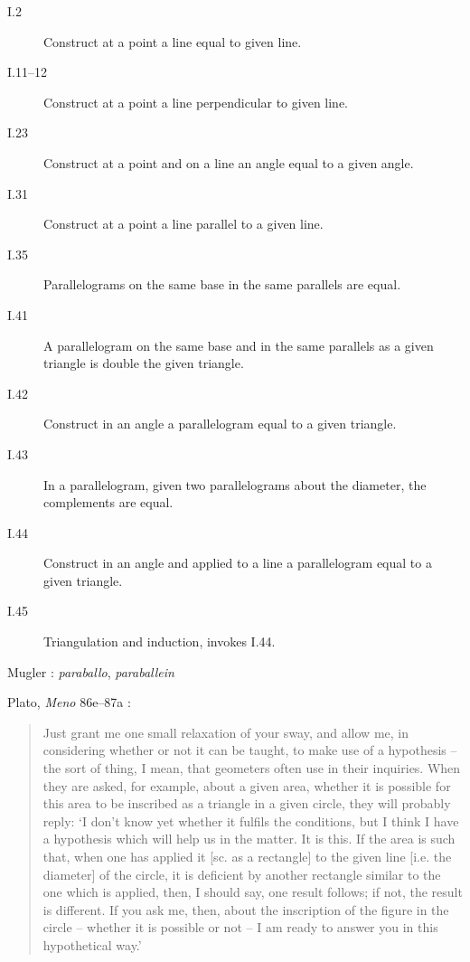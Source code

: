 \documentclass{article}
\begin{document}
\begin{description}
\item[I.2] Construct at a point a line equal to given line.
\item[I.11--12] Construct at a point a line perpendicular to given line.
\item[I.23] Construct at a point and on a line an angle equal to a given angle.
\item[I.31] Construct at a point a line parallel to a given line.
\item[I.35] Parallelograms on the same base in the same parallels are equal.
\item[I.41] A parallelogram on the same base and in the same parallels as a given triangle is double the given triangle.
\item[I.42] Construct in an angle a parallelogram equal to a given triangle.
\item[I.43] In a parallelogram, given two parallelograms about the diameter, the complements are equal.
\item[I.44] Construct in an angle and applied to a line a parallelogram equal to a given triangle.
\item[I.45] Triangulation and induction, invokes I.44.
\end{description}







Mugler \cite[p.~324]{mugler}: {\em paraballo}, {\em paraballein}

Plato, {\em Meno} 86e--87a \cite[p.~140]{guthrie}:

\begin{quote}
Just grant me one small relaxation of your sway, and allow me, in considering whether or not
it can be taught, to make use of a hypothesis -- the sort of thing, I mean, that geometers often
use in their inquiries. When they are asked, for example, about a
given area, whether it is possible
for this area to be inscribed as a triangle in a given circle, they will probably reply: `I don't know yet
whether it fulfils the conditions, but I think I have a hypothesis which will help us in the matter.
It is this. If the area is such that, when one has applied it [sc. as a rectangle] to the given line [i.e. the
diameter] of the circle, it is deficient by another rectangle similar to the one which is applied, then, I should
say, one result follows; if not, the result is different. If you ask me, then, about the inscription of the figure
in the circle -- whether it is possible or not -- I am ready to answer you in this hypothetical way.'
\end{quote}
\end{document}
